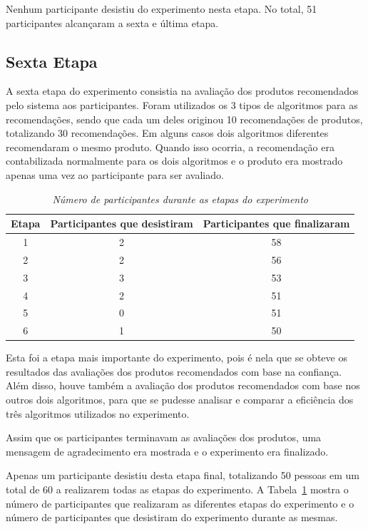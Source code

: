 Nenhum participante desistiu do experimento nesta etapa. No total, 51 participantes alcançaram a sexta e última etapa.

\subsection{Sexta Etapa}

A sexta etapa do experimento consistia na avaliação dos produtos recomendados pelo sistema aos participantes. Foram utilizados os 3 tipos de algoritmos para as recomendações, sendo que cada um deles originou 10 recomendações de produtos, totalizando 30 recomendações. Em alguns casos dois algoritmos diferentes recomendaram o mesmo produto. Quando isso ocorria, a recomendação era contabilizada normalmente para os dois algoritmos e o produto era mostrado apenas uma vez ao participante para ser avaliado.

\begin{table}
\centering
\begin{tabular}{c c c}
	\hline \hline
	\textbf{Etapa}	&	\textbf{Participantes que desistiram}	&	\textbf{Participantes que finalizaram}	\\
	\hline
	1	&	2	&	58	\\
	\hline
	2	&	2	&	56	\\
	\hline
	3	&	3	&	53	\\
	\hline
	4	&	2	&	51	\\
	\hline
	5	&	0	&	51	\\
	\hline
	6	&	1	&	50	\\
	\hline
\end{tabular}
\caption{\it Número de participantes durante as etapas do experimento}
\label{table:participantes}
\end{table}

Esta foi a etapa mais importante do experimento, pois é nela que se obteve os resultados das avaliações dos produtos recomendados com base na confiança. Além disso, houve também a avaliação dos produtos recomendados com base nos outros dois algoritmos, para que se pudesse analisar e comparar a eficiência dos três algoritmos utilizados no experimento.

Assim que os participantes terminavam as avaliações dos produtos, uma mensagem de agradecimento era mostrada e o experimento era finalizado.

Apenas um participante desistiu desta etapa final, totalizando 50 pessoas em um total de 60 a realizarem todas as etapas do experimento. A Tabela~\ref{table:participantes} mostra o número de participantes que realizaram as diferentes etapas do experimento e o número de participantes que desistiram do experimento durante as mesmas.